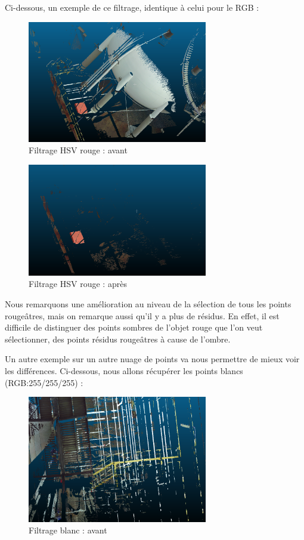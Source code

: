 \documentclass[12pt,titlepage,french]{article}
\begin{document}
Ci-dessous, un exemple de ce filtrage, identique à celui pour le RGB :

\begin{figure}[H]
\center
\includegraphics[width=0.7\textwidth]{./img/1_red.PNG}
\caption{\label{} Filtrage HSV rouge : avant}
\end{figure}

\begin{figure}[H]
\center
\includegraphics[width=0.7\textwidth]{./img/2_red.PNG}
\caption{\label{} Filtrage HSV rouge : après}
\end{figure}

Nous remarquons une amélioration au niveau de la sélection de tous les points rougeâtres, mais on remarque aussi qu'il y a plus de résidus. En effet, il est difficile de distinguer des points sombres de l'objet rouge que l'on veut sélectionner, des points résidus rougeâtres à cause de l'ombre. \newline

Un autre exemple sur un autre nuage de points va nous permettre de mieux voir les différences. Ci-dessous, nous allons récupérer les points blancs (RGB:255/255/255) :

\begin{figure}[H]
\center
\includegraphics[width=0.7\textwidth]{./img/1_white.PNG}
\caption{\label{} Filtrage blanc : avant}
\end{figure}
\end{document}
